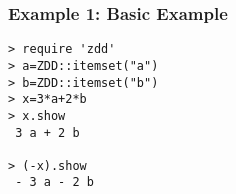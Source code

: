 \subsubsection*{Example 1: Basic Example}



\begin{Verbatim}[baselinestretch=0.7,frame=single]
> require 'zdd'
> a=ZDD::itemset("a")
> b=ZDD::itemset("b")
> x=3*a+2*b
> x.show
 3 a + 2 b

> (-x).show
 - 3 a - 2 b
\end{Verbatim}
